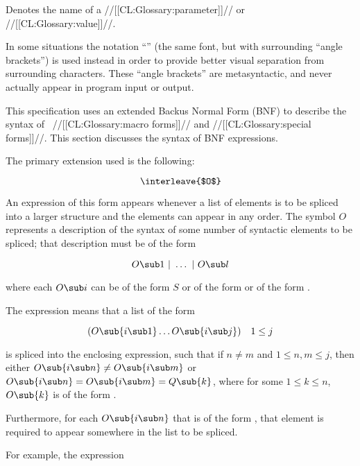 Denotes the name of a //[[CL:Glossary:parameter]]// or //[[CL:Glossary:value]]//.

In some situations the notation ``'' (\ie the same font,
but with surrounding ``angle brackets'') is used instead in order to
provide better visual separation from surrounding characters.  These
``angle brackets'' are metasyntactic, and never actually appear in program
input or output.

\endlist

\endsubsubsection%


This specification uses an extended Backus Normal Form (BNF) to
describe the syntax of \clisp\ //[[CL:Glossary:macro forms]]// and //[[CL:Glossary:special forms]]//.
This section discusses the syntax of BNF expressions.


The primary extension used is the following:

$$\hbox{\interleave{$O$}}$$

An expression of this form appears whenever a list of elements is
to be spliced into a larger structure and the elements can appear in
any order. The symbol $O$ represents a description of the syntax of
some number of syntactic elements to be spliced; that description must
be of the form

$$O\sub 1\ \vert\ \ldots\ \vert\ O\sub l$$

\noindent where each $O\sub i$ can be of the form $S$ or of
the form  or of the form .

The expression  means that a list of the form

$$(O\sub{i\sub 1}\ldots O\sub{i\sub j})\quad 1\leq j$$

\noindent is spliced into the enclosing expression,
such that if $n \neq m$ and $1\leq n,m\leq j$,
then either $O\sub{i\sub n}\neq O\sub{i\sub m}$
         or $O\sub{i\sub n} = O\sub{i\sub m} = Q\sub{k}$, 
where for some $1\leq k \leq n$, $O\sub{k}$ is of the form .

Furthermore, for each $O\sub{i\sub n}$ that is of the form ,
that element is required to appear somewhere in the list to be spliced.


For example, the expression

